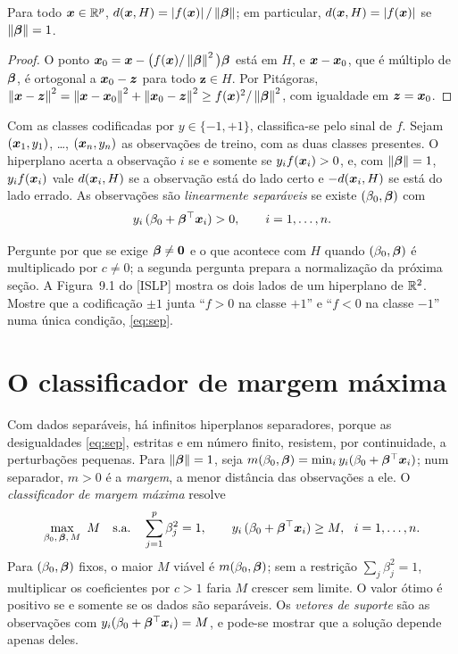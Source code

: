 \documentclass[11pt,a4paper]{article}
\begin{document}
\begin{proposicao}\label{prop:dist}
Para todo $\bm{x}\in\mathbb{R}^p$, $d(\bm{x},H)=\left\lvert f(\bm{x}) \right\rvert/\left\lVert \bm{\beta} \right\rVert$; em particular,
$d(\bm{x},H)=\left\lvert f(\bm{x}) \right\rvert$ se $\left\lVert \bm{\beta} \right\rVert=1$.
\end{proposicao}
\begin{proof}
O ponto $\bm{x}_0=\bm{x}-\big(f(\bm{x})/\left\lVert \bm{\beta} \right\rVert^2\big)\bm{\beta}$ está em $H$, e $\bm{x}-\bm{x}_0$, que é
múltiplo de $\bm{\beta}$, é ortogonal a $\bm{x}_0-\bm z$ para todo $\bm z\in H$. Por
Pitágoras, $\left\lVert \bm{x}-\bm z \right\rVert^2=\left\lVert \bm{x}-\bm{x}_0 \right\rVert^2+\left\lVert \bm{x}_0-\bm z \right\rVert^2\ge
f(\bm{x})^2/\left\lVert \bm{\beta} \right\rVert^2$, com igualdade em $\bm z=\bm{x}_0$.
\end{proof}

Com as classes codificadas por $y\in\{-1,+1\}$, classifica-se pelo sinal de $f$.
Sejam $(\bm{x}_1,y_1)$, \dots, $(\bm{x}_n,y_n)$ as observações de treino, com as duas classes
presentes. O hiperplano acerta a observação $i$ se e somente se $y_if(\bm{x}_i)>0$, e,
com $\left\lVert \bm{\beta} \right\rVert=1$, $y_if(\bm{x}_i)$ vale $d(\bm{x}_i,H)$ se a observação está do lado certo
e $-d(\bm{x}_i,H)$ se está do lado errado.
As observações são \emph{linearmente separáveis} se existe $(\beta_0,\bm{\beta})$ com
\begin{equation}\label{eq:sep}
  y_i\,(\beta_0+\bm{\beta}^\top\bm{x}_i)>0,\qquad i=1,\dots,n.
\end{equation}

\begin{emsala}
Pergunte por que se exige $\bm{\beta}\ne\bm 0$ e o que acontece com $H$ quando
$(\beta_0,\bm{\beta})$ é multiplicado por $c\ne0$; a segunda pergunta prepara a
normalização da próxima seção. A Figura~9.1 do [ISLP] mostra os dois lados de um
hiperplano de $\mathbb{R}^2$. Mostre que a codificação $\pm1$ junta ``$f>0$ na classe $+1$'' e
``$f<0$ na classe $-1$'' numa única condição, \eqref{eq:sep}.
\end{emsala}

\section{O classificador de margem máxima}
Com dados separáveis, há infinitos hiperplanos separadores, porque as desigualdades
\eqref{eq:sep}, estritas e em número finito, resistem, por continuidade, a perturbações
pequenas. Para $\left\lVert \bm{\beta} \right\rVert=1$, seja
$m(\beta_0,\bm{\beta})=\min_iy_i(\beta_0+\bm{\beta}^\top\bm{x}_i)$; num separador, $m>0$ é a
\emph{margem}, a menor distância das observações a ele. O \emph{classificador de margem
máxima} resolve
\begin{equation}\label{eq:mm}
  \max_{\beta_0,\,\bm{\beta},\,M}\ M
  \quad\text{s.a.}\quad
  \sum_{j=1}^p\beta_j^2=1,\qquad
  y_i\,(\beta_0+\bm{\beta}^\top\bm{x}_i)\ge M,\ \ i=1,\dots,n.
\end{equation}
Para $(\beta_0,\bm{\beta})$ fixos, o maior $M$ viável é $m(\beta_0,\bm{\beta})$; sem a
restrição $\sum_j\beta_j^2=1$, multiplicar os coeficientes por $c>1$ faria $M$ crescer
sem limite. O valor ótimo é positivo se e somente se os dados são separáveis.
Os \emph{vetores de suporte} são as observações com $y_i(\beta_0+\bm{\beta}^\top\bm{x}_i)=M$,
e pode-se mostrar que a solução depende apenas deles.
\end{document}
